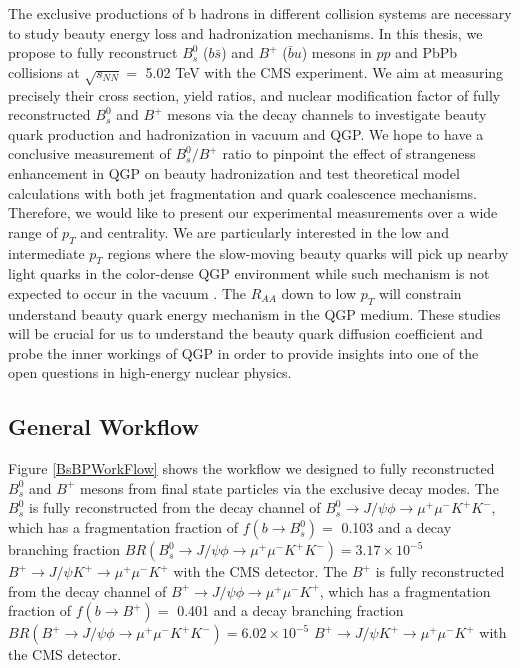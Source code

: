 The exclusive productions of b hadrons in different collision systems are necessary to study beauty energy loss and hadronization mechanisms. In this thesis, we propose to fully reconstruct $B^0_s$ ($b\bar s$) and $B^+$ ($\bar b u$) mesons in $pp$ and PbPb collisions at $\sqrt{s_{NN}} = $ 5.02 TeV with the CMS experiment. We aim at measuring precisely their cross section, yield ratios, and nuclear modification factor of fully reconstructed $B^0_s$ and $B^+$ mesons via the decay channels to investigate beauty quark production and hadronization in vacuum and QGP. We hope to have a conclusive measurement of $B^0_s/B^+$ ratio to pinpoint the effect of strangeness enhancement in QGP on beauty hadronization and test theoretical model calculations \cite{StrangetoLight} with both jet fragmentation \cite{JetFrag} and quark coalescence \cite{QuarkCoal} mechanisms. Therefore, we would like to present our experimental measurements over a wide range of $p_T$ and centrality. We are particularly interested in the low and intermediate $p_T$ regions where the slow-moving beauty quarks will pick up nearby light quarks in the color-dense QGP environment while such mechanism is not expected to occur in the vacuum \cite{HQRaff}. The $R_{AA}$ down to low $p_T$ will constrain understand beauty quark energy mechanism in the QGP medium. These studies will be crucial for us to understand the beauty quark diffusion coefficient and probe the inner workings of QGP in order to provide insights into one of the open questions in high-energy nuclear physics. 

\subsection{General Workflow}

Figure \ref{BsBPWorkFlow} shows the workflow we designed to fully reconstructed $B^0_s$ and $B^+$ mesons from final state particles via the exclusive decay modes. The $B^0_s$ is fully reconstructed from the decay channel of $B^0_s \rightarrow J/\psi \phi \rightarrow \mu^+\mu^- K^+K^-$, which has a fragmentation fraction of $f(b\rightarrow B_s^0) =$ 0.103 and a decay branching fraction $BR(B^0_s \rightarrow J/\psi \phi \rightarrow \mu^+\mu^- K^+K^-) = 3.17 \times 10^{-5}$ $B^+ \rightarrow J/\psi K^+\rightarrow \mu^+\mu^- K^+$ with the CMS detector. The $B^+$ is fully reconstructed from the decay channel of $B^+ \rightarrow J/\psi \phi \rightarrow \mu^+\mu^- K^+$, which has a fragmentation fraction of $f(b\rightarrow B^+) =$ 0.401 and a decay branching fraction $BR(B^+ \rightarrow J/\psi \phi \rightarrow \mu^+\mu^- K^+K^-) = 6.02 \times 10^{-5}$ $B^+ \rightarrow J/\psi K^+\rightarrow \mu^+\mu^- K^+$ with the CMS detector. 




